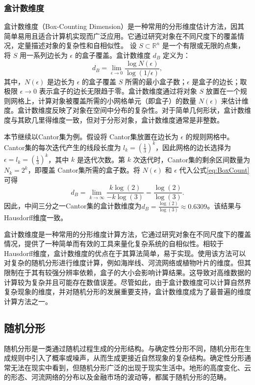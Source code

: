 \subsubsection{盒计数维度}
盒计数维度（Box-Counting Dimension）是一种常用的分形维度估计方法，因其简单易用且适合计算机实现而广泛应用。它通过研究对象在不同尺度下的覆盖情况，定量描述对象的复杂性和自相似性。
设 $S \subset \mathbb{R}^n$ 是一个有限或无限的点集，将 $S$ 用一系列边长为 $\epsilon$ 的盒子覆盖。盒计数维度 $d_B$ 定义为：
\begin{equation}
d_B = \lim_{\epsilon \to 0} \frac{\log N(\epsilon)}{\log(1/\epsilon)},
\label{eq:BoxCount}
\end{equation}
其中，$N(\epsilon)$ 是边长为 $\epsilon$ 的盒子覆盖 $S$ 所需的最小盒子数；$\epsilon$ 是盒子的边长；取极限 $\epsilon \to 0$ 表示盒子的边长无限趋于零。盒计数维度通过将对象 $S$ 放置在一个规则网格上，计算对象被覆盖所需的小网格单元（即盒子）的数量 $N(\epsilon)$ 来估计维度。盒计数维度反映了对象在空间中分布的复杂性。对于简单几何形状，盒计数维度与其欧几里得维度一致，但对于分形对象，盒计数维度通常是非整数。

本节继续以Cantor集为例。假设将 Cantor集放置在边长为 $\epsilon$ 的规则网格中。Cantor集的每次迭代产生的线段长度为 $l_k = \left(\frac{1}{3}\right)^k$，因此网格的边长选择为 $\epsilon = l_k = \left(\frac{1}{3}\right)^k$，其中 $k$ 是迭代次数。第 $k$ 次迭代时，Cantor集的剩余区间数量为 $N_k = 2^k$，即覆盖 Cantor集所需的盒子数。将 $N(\epsilon)$ 和 $\epsilon$ 代入公式\ref{eq:BoxCount}可得
\begin{equation}
d_B = \lim_{k \to \infty} \frac{k \log(2)}{-k \log(3)} = \frac{\log(2)}{\log(3)}.
\end{equation}
因此，中间三分之一Cantor集的盒计数维度为$d_B = \frac{\log(2)}{\log(3)} \approx 0.6309$。该结果与Hausdorff维度一致。

盒计数维度是一种常用的分形维度计算方法，它通过研究对象在不同尺度下的覆盖情况，提供了一种简单而有效的工具来量化复杂系统的自相似性。相较于Hausdorff维度，盒计数维度的优点在于其算法简单，易于实现。使用该方法可以对复杂的随机分形进行维度计算，例如海岸线、河流网络或植物叶片的维度\cite{Mandelbrot1982}。但其限制在于其有较强分辨率依赖，盒子的大小会影响计算结果。这导致对高维数据的计算较为复杂并且可能存在数值误差。尽管如此，由于盒计数维度可以计算自然界复杂现象的维度，并对随机分形的发展重要支持，盒计数维度成为了最普遍的维度计算方法之一。
\subsection{随机分形}
随机分形是一类通过随机过程生成的分形结构。与确定性分形不同，随机分形在生成规则中引入了概率或噪声，从而生成更接近自然现象的复杂结构。确定性分形通常无法在现实中看到，但随机分形广泛的出现于现实生活中。地形的高度变化、云的形态、河流网络的分布以及金融市场的波动等，都属于随机分形的范畴。

